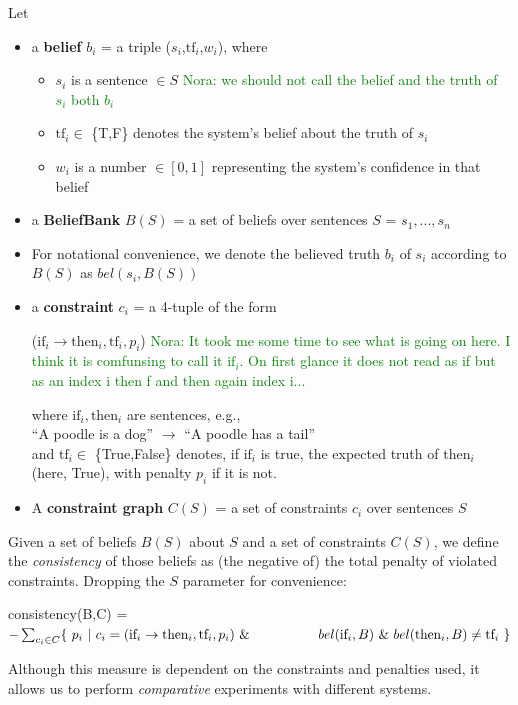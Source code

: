 \documentclass[11pt]{article}
\newcommand{\nk}[1]{\textcolor{green}{Nora: #1}}
\newenvironment{myquote}{                   %
  \parskip 0mm \begin{quoting}[vskip=0mm,leftmargin=2mm]}{
\end{quoting}}
\newenvironment{ite}{                     %
     \parskip 0cm \begin{itemize} \parskip 0cm \parsep 0cm \itemsep 0cm \topsep 0cm}{
        \end{itemize}} %
\begin{document}
\noindent Let
\vspace{-2mm}
\begin{ite}
 \item a {\bf belief} $b_i$ = a triple ($s_i$,$\textrm{tf}_i$,$w_i$), where
    \begin{ite}
     \item $s_i$ is a sentence $\in S$ %
     \nk{we should not call the belief and the truth of $s_i$ both $b_i$}
     \item $\textrm{tf}_i \in$ \{T,F\} denotes the system's belief about the truth of $s_i$
     \item $w_i$ is a number $\in [0,1]$ representing the system's confidence in that belief
    \end{ite}
 \item a {\bf BeliefBank} $B(S)$ = a set of beliefs over sentences $S$ = $s_1,...,s_n$
 \item For notational convenience, we denote the believed truth $b_i$ of $s_i$ according to $B(S)$ as $bel(s_i,B(S))$
 \item a {\bf constraint} $c_i$ = a 4-tuple of the form
\begin{myquote} \centering
($\textrm{if}_i \rightarrow \textrm{then}_i, \textrm{tf}_i, p_i$)
\nk{It took me some time to see what is going on here. I think it is comfunsing to call it $\textrm{if}_i$. On first glance it does not read as if but as an index i then f and then again index i...}
\end{myquote} 
where $\textrm{if}_i, \textrm{then}_i$ are sentences, e.g., \\
\vspace{1mm}
\hspace*{1mm} ``A poodle is a dog'' $\rightarrow$ ``A poodle has a tail'' \\
\vspace{1mm} 
and $\textrm{tf}_i \in$ \{True,False\} denotes, if $\textrm{if}_i$ is true, the expected truth of $\textrm{then}_i$ (here, True),
with penalty $p_i$ if it is not.
\item A {\bf constraint graph} $C(S)$ = a set of constraints $c_i$ over sentences $S$
\end{ite}
Given a set of beliefs $B(S)$ about $S$ and a set of constraints $C(S)$, we define the {\it consistency}
of those beliefs as (the negative of) the total penalty of violated constraints.
Dropping the $S$ parameter for convenience:
 \begin{myquote}
  consistency(B,C) = \\
\hspace*{2mm}  $- \sum_{c_i \in C} \{~ p_i ~ | ~ c_i = (\textrm{if}_i \rightarrow \textrm{then}_i, \textrm{tf}_i, p_i )       ~\& \\
\hspace*{18mm}  bel(\textrm{if}_i,B) ~ \& ~ bel(\textrm{then}_i,B) \neq \textrm{tf}_i~ \}$
\end{myquote}
Although this measure is dependent on the constraints and penalties used,
it allows us to perform {\it comparative} experiments with different systems.
\end{document}
